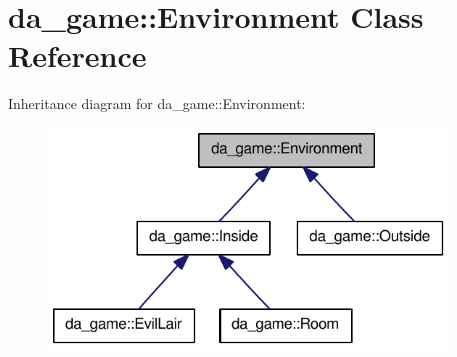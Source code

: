 \hypertarget{classda__game_1_1Environment}{
\section{da\_\-game::Environment Class Reference}
\label{classda__game_1_1Environment}
}
Inheritance diagram for da\_\-game::Environment:\nopagebreak
\begin{figure}[H]
\begin{center}
\leavevmode
\includegraphics[width=301pt]{classda__game_1_1Environment__inherit__graph}
\end{center}
\end{figure}
